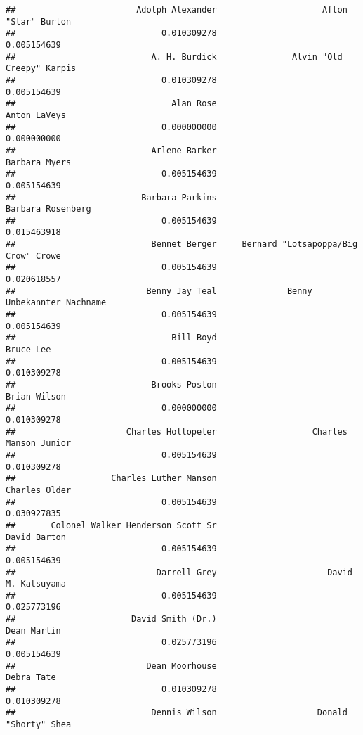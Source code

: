 \documentclass[
]{article}
\begin{document}
\begin{verbatim}
##                        Adolph Alexander                     Afton "Star" Burton 
##                             0.010309278                             0.005154639 
##                           A. H. Burdick               Alvin "Old Creepy" Karpis 
##                             0.010309278                             0.005154639 
##                               Alan Rose                            Anton LaVeys 
##                             0.000000000                             0.000000000 
##                           Arlene Barker                           Barbara Myers 
##                             0.005154639                             0.005154639 
##                         Barbara Parkins                       Barbara Rosenberg 
##                             0.005154639                             0.015463918 
##                           Bennet Berger     Bernard "Lotsapoppa/Big Crow" Crowe 
##                             0.005154639                             0.020618557 
##                          Benny Jay Teal              Benny Unbekannter Nachname 
##                             0.005154639                             0.005154639 
##                               Bill Boyd                               Bruce Lee 
##                             0.005154639                             0.010309278 
##                           Brooks Poston                            Brian Wilson 
##                             0.000000000                             0.010309278 
##                      Charles Hollopeter                   Charles Manson Junior 
##                             0.005154639                             0.010309278 
##                   Charles Luther Manson                           Charles Older 
##                             0.005154639                             0.030927835 
##       Colonel Walker Henderson Scott Sr                            David Barton 
##                             0.005154639                             0.005154639 
##                            Darrell Grey                      David M. Katsuyama 
##                             0.005154639                             0.025773196 
##                       David Smith (Dr.)                             Dean Martin 
##                             0.025773196                             0.005154639 
##                          Dean Moorhouse                              Debra Tate 
##                             0.010309278                             0.010309278 
##                           Dennis Wilson                    Donald "Shorty" Shea 

\end{verbatim}
\end{document}
